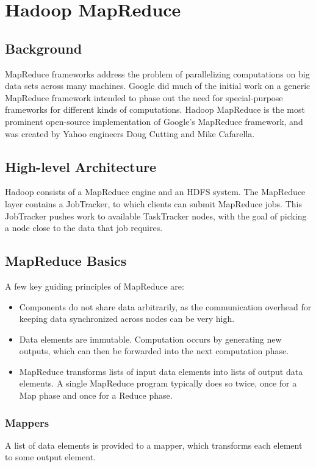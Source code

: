 \documentclass[12pt,titlepage]{article}
\let\stdsection\section
\renewcommand\section{\clearpage\stdsection}
\begin{document}
  \section{Hadoop MapReduce}

    \subsection{Background}
      MapReduce frameworks address the problem of parallelizing computations on big data sets across many machines. Google did much of the initial work on a generic
      MapReduce framework intended to phase out the need for special-purpose frameworks for different kinds of computations. Hadoop MapReduce is the most prominent
      open-source implementation of Google's MapReduce framework, and was created by Yahoo engineers Doug Cutting and Mike Cafarella.

    \subsection{High-level Architecture}
      Hadoop consists of a MapReduce engine and an HDFS system. The MapReduce layer contains a JobTracker, to which clients can submit MapReduce jobs. This JobTracker
      pushes work to available TaskTracker nodes, with the goal of picking a node close to the data that job requires.

    \subsection{MapReduce Basics}
      A few key guiding principles of MapReduce are:
      \begin{itemize}
        \item Components do not share data arbitrarily, as the communication overhead for keeping data synchronized across nodes can be very high.
        \item Data elements are immutable. Computation occurs by generating new outputs, which can then be forwarded into the next computation phase.
        \item MapReduce transforms lists of input data elements into lists of output data elements. A single MapReduce program typically does so twice, once for a
        Map phase and once for a Reduce phase.
      \end{itemize}

      \subsubsection{Mappers}
        A list of data elements is provided to a mapper, which transforms each element to some output element.
\end{document}
